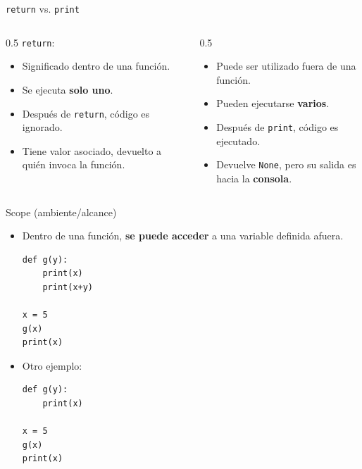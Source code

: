 \documentclass[mathserif]{beamer}
\begin{document}
\begin{frame}[fragile]{\lstinline|return| vs. \lstinline|print|}
    \begin{columns}
        \begin{column}{0.5\textwidth}
        \lstinline|return|:
        \begin{itemize}
            \item Significado {\blue dentro} de una función.
            \item Se ejecuta {\blue\bfseries solo uno}.
            \item Después de \lstinline|return|, código es {\blue ignorado}.
            \item Tiene valor asociado, {\blue devuelto a quién invoca la función}.
        \end{itemize}
        \end{column}
        \begin{column}{0.5\textwidth}
        \begin{itemize}
            \item Puede ser utilizado {\blue fuera} de una función.
            \item Pueden ejecutarse {\blue\bfseries varios}.
            \item Después de \lstinline|print|, código es {\blue ejecutado}.
            \item Devuelve \lstinline|None|, pero su salida es hacia la {\blue\bfseries consola}.
        \end{itemize}
        \end{column}
    \end{columns}
\end{frame}



\begin{frame}[fragile]{Scope (ambiente/alcance)}
    \begin{itemize}
        \item Dentro de una función, {\blue\bfseries se puede acceder} a una variable definida afuera.     
\begin{lstlisting}
def g(y):
    print(x)
    print(x+y)

x = 5
g(x)
print(x)
\end{lstlisting}

    \item Otro ejemplo: 
\begin{lstlisting}
def g(y):
    print(x)

x = 5
g(x)
print(x)
\end{lstlisting}
        
    \end{itemize}
\end{frame}
\end{document}
